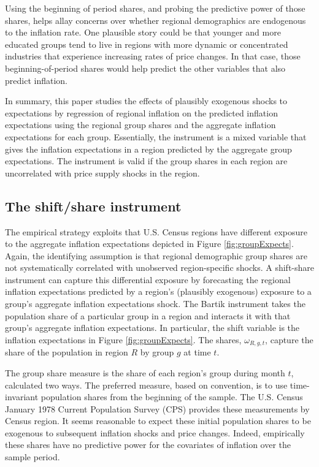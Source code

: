\documentclass[12pt]{article}
\begin{document}
Using the beginning of period shares, and probing the predictive power of those shares, helps allay concerns over whether regional demographics are endogenous to the inflation rate. One plausible story could be that younger and more educated groups tend to live in regions with more dynamic or concentrated industries that experience increasing rates of price changes. In that case, those beginning-of-period shares would help predict the other variables that also predict inflation.  

In summary, this paper studies the effects of plausibly exogenous shocks to expectations by regression of regional inflation on the predicted inflation expectations using the regional group shares and the aggregate inflation expectations for each group. Essentially, the instrument is a mixed variable that gives the inflation expectations in a region predicted by the aggregate group expectations. The instrument is valid if the group shares in each region are uncorrelated with price supply shocks in the region.

 \subsection{The shift/share instrument}


The empirical strategy exploits that U.S. Census regions have different exposure to the aggregate inflation expectations depicted in Figure \ref{fig:groupExpects}. Again, the identifying assumption is that regional demographic group shares are not systematically correlated with unobserved region-specific shocks. A shift-share instrument can capture this differential exposure by forecasting the regional inflation expectations predicted by a region's (plausibly exogenous) exposure to a group's aggregate inflation expectations shock. The Bartik instrument takes the population share of a particular group in a region and interacts it with that group's aggregate inflation expectations. In particular, the shift variable is the inflation expectations in Figure \ref{fig:groupExpects}. The shares, $\omega_{R,g,t}$, capture the share of the population in region $R$ by group $g$ at time $t$.  

The group share measure is the share of each region's group during month $t$, calculated two ways. The preferred measure, based on convention, is to use time-invariant population shares from the beginning of the sample. The U.S. Census January 1978 Current Population Survey (CPS) provides these measurements by Census region. It seems reasonable to expect these initial population shares to be exogenous to subsequent inflation shocks and price changes. Indeed, empirically these shares have no predictive power for the covariates of inflation over the sample period.  
\end{document}
